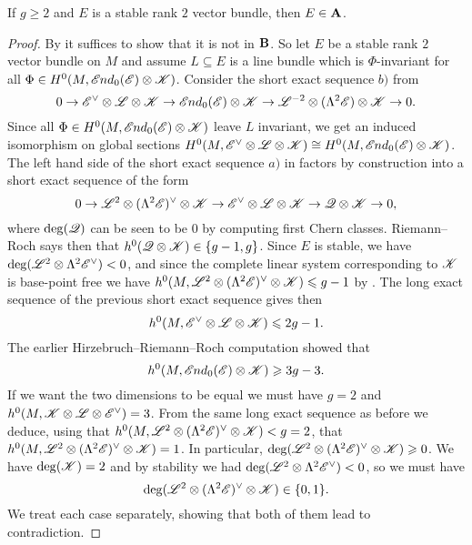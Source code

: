 \documentclass[A4paper, 12pt, british, reqno]{amsart}
\newcommand{\ot}{\otimes}
\newcommand{\dual}{^{\vee}}
\newcommand{\1}{\mathbbm{1}}
\begin{document}
\begin{lm}\label{lm:stable}
    If $g\geqslant 2$ and $E$ is a stable rank $2$ vector bundle, then $E\in \mathbf{A}$.
    \begin{proof}
	By  it suffices to show that it is not in $\mathbf{B}$.
	So let $E$ be a stable rank $2$ vector bundle on $M$ and assume $L\subseteq E$ is a line bundle which is $\Phi$-invariant for all $\Phi\in H^{0}(M,\sEnd_{0}(\E)\ot \sK)$.
	Consider the short exact sequence $b)$ from 
	\[ 0\to \E\dual\ot \L\ot\sK\to \sEnd_{0}(\E)\ot \sK \to \L^{-2}\ot (\Lambda^{2}\E)\ot\sK\to 0. \]
	Since all $\Phi\in H^{0}(M,\sEnd_{0}(\E)\ot\sK)$ leave $L$ invariant, we get an induced isomorphism on global sections $H^{0}(M,\E\dual\ot\L\ot\sK)\cong H^{0}(M,\sEnd_{0}(\E)\ot \sK)$.
	The left hand side of the short exact sequence $a)$ in  factors by construction into a short exact sequence of the form 
	\[ 0\to \L^{2}\ot (\Lambda^{2}\E)\dual\ot\sK \to \E\dual \ot \L\ot \sK\to \sQ\ot\sK\to 0, \]
	where $\deg(\mathscr{Q})$ can be seen to be $0$ by computing first Chern classes.
	Riemann--Roch says then that $h^{0}(\sQ\ot\sK)\in \{g-1,g\}$.
	Since $E$ is stable, we have $\deg(\L^{2}\ot \Lambda^{2}\E\dual)<0$, and since the complete linear system corresponding to $\mathscr{K}$ is base-point free \cite[Lemma IV.5.1]{har77}
	    we have $h^{0}(M,\L^{2}\ot(\Lambda^{2}\E)\dual\ot\sK)\leqslant g-1$ by \cite[Proposition IV.3.1]{har77}.
	The long exact sequence of the previous short exact sequence gives then
	\[ h^{0}(M,\E\dual\ot\L\ot\sK)\leqslant 2g-1. \]
	The earlier Hirzebruch--Riemann--Roch computation showed that
	\[ h^{0}(M,\sEnd_{0}(\E)\ot \sK)\geqslant 3g-3. \]
	If we want the two dimensions to be equal we must have $g=2$ and $h^{0}(M,\sK\ot\L\ot\E\dual)=3$.
	From the same long exact sequence as before we deduce, using that $h^{0}(M,\L^{2}\ot (\Lambda^{2}\E)\dual\ot \sK)<g=2$, that $h^{0}(M,\L^{2}\ot(\Lambda^{2}\E)\dual\ot\sK)=1$.
	In particular, $\deg(\L^{2}\ot(\Lambda^{2}\E)\dual\ot\sK)\geqslant 0$.
	We have $\deg(\mathscr{K})=2$ and by stability we had $\deg(\L^{2}\ot \Lambda^{2}\E\dual)<0$, so we must have
	\[ \deg(\L^{2}\ot (\Lambda^{2}\E)\dual\ot\sK)\in \{0,1\}. \]
	We treat each case separately, showing that both of them lead to contradiction.


\end{proof}
\end{lm}
\end{document}
